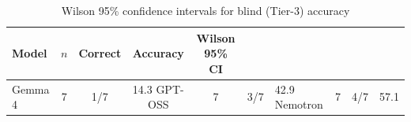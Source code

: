 \begin{table}[htbp]
\centering
\caption{Wilson 95\% confidence intervals for blind (Tier-3) accuracy}
\label{tab:wilson_ci}
\begin{tabular}{lcccc}
\toprule
\textbf{Model} & \textbf{$n$} & \textbf{Correct} & \textbf{Accuracy} & \textbf{Wilson 95\% CI} \\
\midrule
Gemma 4 & 7 & 1/7 & 14.3%
GPT-OSS & 7 & 3/7 & 42.9%
Nemotron & 7 & 4/7 & 57.1%
\bottomrule
\end{tabular}
\end{table}
